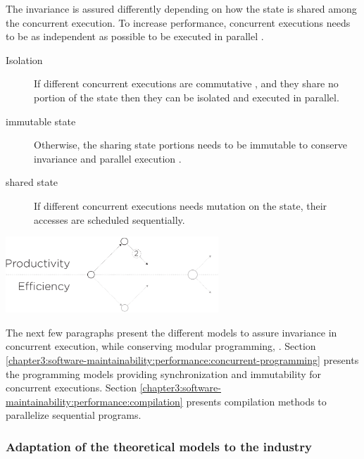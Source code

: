 The invariance is assured differently depending on how the state is shared among the concurrent execution.
To increase performance, concurrent executions needs to be as independent as possible to be executed in parallel .
\begin{description}
  \item[Isolation] If different concurrent executions are commutative \cite{Rinard1996,Clements2013a}, and they share no portion of the state then they can be isolated and executed in parallel.
  \item[immutable state] Otherwise, the sharing state portions needs to be immutable to conserve invariance and parallel execution \cite{Gordon2012,Matsakis2012a}.
  \item[shared state] If different concurrent executions needs mutation on the state, their accesses are scheduled sequentially.
\end{description}

\begin{center}
\includegraphics[width=0.6\textwidth]{../resources/state-of-the-art-2.pdf}
\end{center}

The next few paragraphs present the different models to assure invariance in concurrent execution, while conserving modular programming, .
Section \ref{chapter3:software-maintainability:performance:concurrent-programming} presents the programming models providing synchronization and immutability for concurrent executions.
Section \ref{chapter3:software-maintainability:performance:compilation} presents compilation methods to parallelize sequential programs.



\subsubsection{Adaptation of the theoretical models to the industry}

